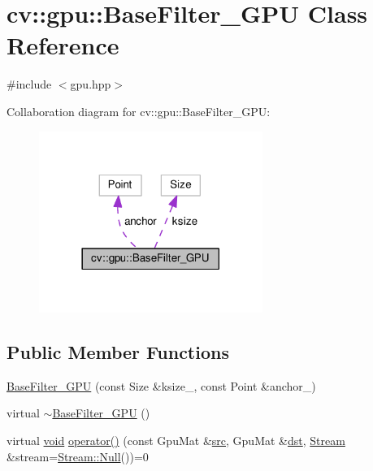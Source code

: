 \hypertarget{classcv_1_1gpu_1_1BaseFilter__GPU}{\section{cv\-:\-:gpu\-:\-:Base\-Filter\-\_\-\-G\-P\-U Class Reference}
\label{classcv_1_1gpu_1_1BaseFilter__GPU}
}


{\ttfamily \#include $<$gpu.\-hpp$>$}



Collaboration diagram for cv\-:\-:gpu\-:\-:Base\-Filter\-\_\-\-G\-P\-U\-:\nopagebreak
\begin{figure}[H]
\begin{center}
\leavevmode
\includegraphics[width=206pt]{classcv_1_1gpu_1_1BaseFilter__GPU__coll__graph}
\end{center}
\end{figure}
\subsection*{Public Member Functions}
\begin{DoxyCompactItemize}
\item 
\hyperlink{classcv_1_1gpu_1_1BaseFilter__GPU_ab76fd1d04c68a7a324e2b54e03bc09b2}{Base\-Filter\-\_\-\-G\-P\-U} (const Size \&ksize\-\_\-, const Point \&anchor\-\_\-)
\item 
virtual \hyperlink{classcv_1_1gpu_1_1BaseFilter__GPU_a5e7ec9531cf580290af49d4cadebc6e0}{$\sim$\-Base\-Filter\-\_\-\-G\-P\-U} ()
\item 
virtual \hyperlink{legacy_8hpp_a8bb47f092d473522721002c86c13b94e}{void} \hyperlink{classcv_1_1gpu_1_1BaseFilter__GPU_afeb6388616007e7edee7ea8ba9b961d0}{operator()} (const Gpu\-Mat \&\hyperlink{legacy_8hpp_a371cd109b74033bc4366f584edd3dacc}{src}, Gpu\-Mat \&\hyperlink{photo__c_8h_aed13e2a25279b24dc954073233fef7a5}{dst}, \hyperlink{classcv_1_1gpu_1_1Stream}{Stream} \&stream=\hyperlink{classcv_1_1gpu_1_1Stream_af96c23564834f88333dcb8997df553f1}{Stream\-::\-Null}())=0
\end{DoxyCompactItemize}

